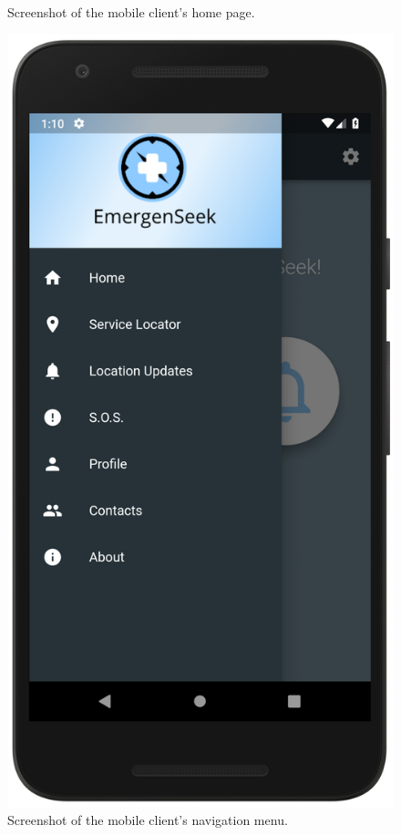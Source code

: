 \documentclass[10pt, a4paper]{article}
\begin{document}
\begin{figure}[H]
  \caption{Screenshot of the mobile client's home page.}\label{fig:mobile1}
\endminipage\hfill
{}
  \includegraphics[width=\linewidth]{demo_navmenu.png}
  \caption{Screenshot of the mobile client's navigation menu.}\label{fig:mobile2}

\end{figure}
\end{document}
